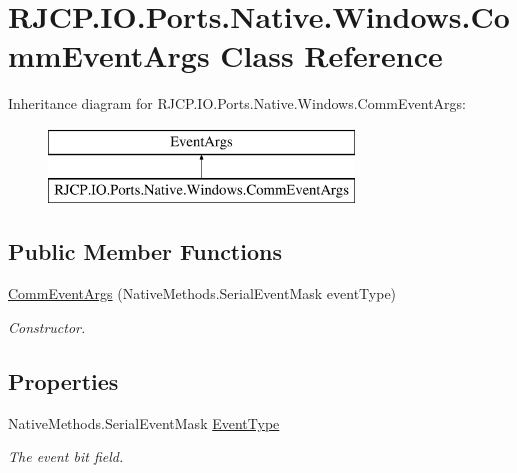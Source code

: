 \hypertarget{class_r_j_c_p_1_1_i_o_1_1_ports_1_1_native_1_1_windows_1_1_comm_event_args}{}\section{R\+J\+C\+P.\+I\+O.\+Ports.\+Native.\+Windows.\+Comm\+Event\+Args Class Reference}
\label{class_r_j_c_p_1_1_i_o_1_1_ports_1_1_native_1_1_windows_1_1_comm_event_args}
Inheritance diagram for R\+J\+C\+P.\+I\+O.\+Ports.\+Native.\+Windows.\+Comm\+Event\+Args\+:\begin{figure}[H]
\begin{center}
\leavevmode
\includegraphics[height=2.000000cm]{class_r_j_c_p_1_1_i_o_1_1_ports_1_1_native_1_1_windows_1_1_comm_event_args}
\end{center}
\end{figure}
\subsection*{Public Member Functions}
\begin{DoxyCompactItemize}
\item 
\mbox{\hyperlink{class_r_j_c_p_1_1_i_o_1_1_ports_1_1_native_1_1_windows_1_1_comm_event_args_a09d2e2258f2419844bc298112997b55d}{Comm\+Event\+Args}} (Native\+Methods.\+Serial\+Event\+Mask event\+Type)
\begin{DoxyCompactList}\small\item\em Constructor. \end{DoxyCompactList}\end{DoxyCompactItemize}
\subsection*{Properties}
\begin{DoxyCompactItemize}
\item 
Native\+Methods.\+Serial\+Event\+Mask \mbox{\hyperlink{class_r_j_c_p_1_1_i_o_1_1_ports_1_1_native_1_1_windows_1_1_comm_event_args_a80bd227c89173c912943943b842b4e84}{Event\+Type}}
\begin{DoxyCompactList}\small\item\em The event bit field. \end{DoxyCompactList}\end{DoxyCompactItemize}


